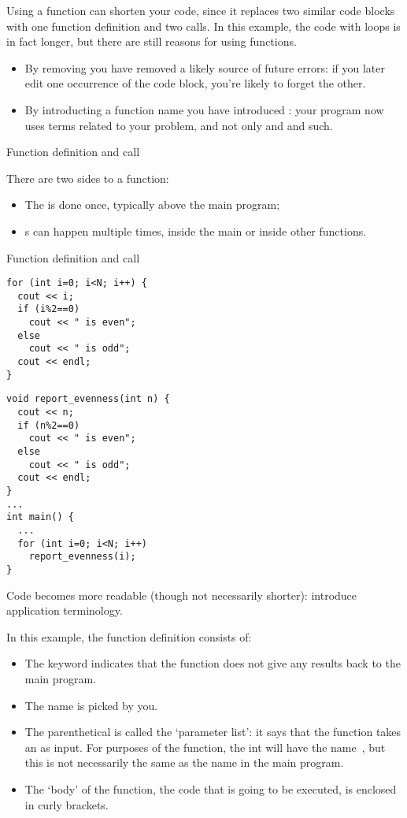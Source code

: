 Using a function can shorten your code, since it replaces two similar
code blocks with one function definition and two calls.
In this example, the code with loops is in fact longer, but there are
still reasons for using functions.
\begin{itemize}
\item By removing  you have removed a
  likely source of future errors: if you later edit one occurrence of
  the code block, you're likely to forget the other.
\item By introducting a function name you have introduced
  : your program now uses terms related to your
  problem, and not only  and  and such.
\end{itemize}

 {Function definition and call}

There are two sides to a function:
\begin{itemize}
\item
  The  is done once, typically
  above the main program;
\item {}s can happen multiple times, inside
  the main or inside other functions.
\end{itemize}

\begin{block}{Function definition and call}
  \label{sl:def-call}
  \begin{multicols}{2}
\begin{verbatim}
for (int i=0; i<N; i++) {
  cout << i;
  if (i%2==0)
    cout << " is even";
  else
    cout << " is odd";
  cout << endl;
}
\end{verbatim}
\columnbreak
\begin{verbatim}
void report_evenness(int n) {
  cout << n;
  if (n%2==0)
    cout << " is even";
  else
    cout << " is odd";
  cout << endl;
}
...
int main() {
  ...
  for (int i=0; i<N; i++)
    report_evenness(i);
}
\end{verbatim}
  \end{multicols}
Code becomes more readable (though not necessarily shorter): introduce
application terminology.
\end{block}

In this example, the function definition consists of:
\begin{itemize}
\item The keyword  indicates that the function does
  not give any results back to the main program.
\item The name  is picked by you.
\item The parenthetical  is called the `parameter list': it
  says that the function takes an  as input. For purposes of
  the function, the int will have the name~, but this is not
  necessarily the same as the name in the main program.
\item The `body' of the function, the code that is going to be
  executed, is enclosed in curly brackets.
\end{itemize}

